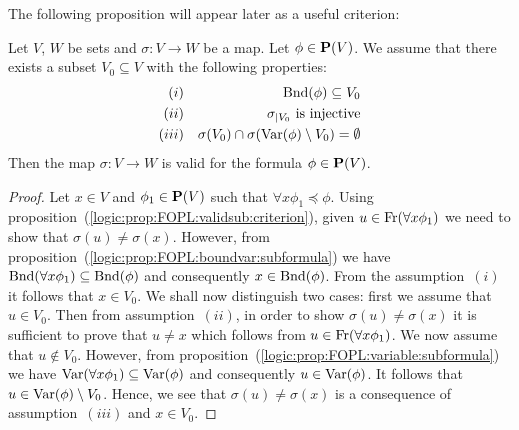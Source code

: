 The following proposition will appear later as a useful criterion:
\begin{prop}\label{logic:prop:FOPL:validsub:minimalextension}
Let $V$, $W$ be sets and $\sigma:V\to W$ be a map. Let $\phi\in\mbox{${\bf P}(V)$}$.
We assume that there exists a subset $V_{0}\subseteq V$ with the
following properties:
    \begin{eqnarray*}
    (i)&&\mbox{\rm Bnd}(\phi)\subseteq V_{0}\\
    (ii)&&\mbox{$\sigma_{|V_{0}}$ is injective}\\
    (iii)&&\sigma(V_{0})\cap\sigma(\mbox{\rm Var}(\phi)\setminus
    V_{0})=\emptyset
    \end{eqnarray*}
Then the map $\sigma:V\to W$ is valid for the formula $\phi\in\mbox{${\bf P}(V)$}$.
\end{prop}
\begin{proof}
Let $x\in V$ and $\phi_{1}\in\mbox{${\bf P}(V)$}$ such that $\forall
x\phi_{1}\preceq\phi$. Using
proposition~(\ref{logic:prop:FOPL:validsub:criterion}), given
$u\in\mbox{\rm Fr}(\forall x\phi_{1})$ we need to show that
$\sigma(u)\neq\sigma(x)$. However, from
proposition~(\ref{logic:prop:FOPL:boundvar:subformula}) we have
$\mbox{\rm Bnd}(\forall x\phi_{1})\subseteq\mbox{\rm Bnd}(\phi)$ and consequently
$x\in\mbox{\rm Bnd}(\phi)$. From the assumption~$(i)$ it follows that $x\in
V_{0}$. We shall now distinguish two cases: first we assume that
$u\in V_{0}$. Then from assumption~$(ii)$, in order to show
$\sigma(u)\neq\sigma(x)$ it is sufficient to prove that $u\neq x$
which follows from $u\in\mbox{\rm Fr}(\forall x\phi_{1})$. We now assume
that $u\not\in V_{0}$. However, from
proposition~(\ref{logic:prop:FOPL:variable:subformula}) we have
$\mbox{\rm Var}(\forall x\phi_{1})\subseteq\mbox{\rm Var}(\phi)$ and consequently
$u\in\mbox{\rm Var}(\phi)$. It follows that $u\in\mbox{\rm Var}(\phi)\setminus V_{0}$.
Hence, we see that $\sigma(u)\neq\sigma(x)$ is a consequence of
assumption~$(iii)$ and $x\in V_{0}$.
\end{proof}

